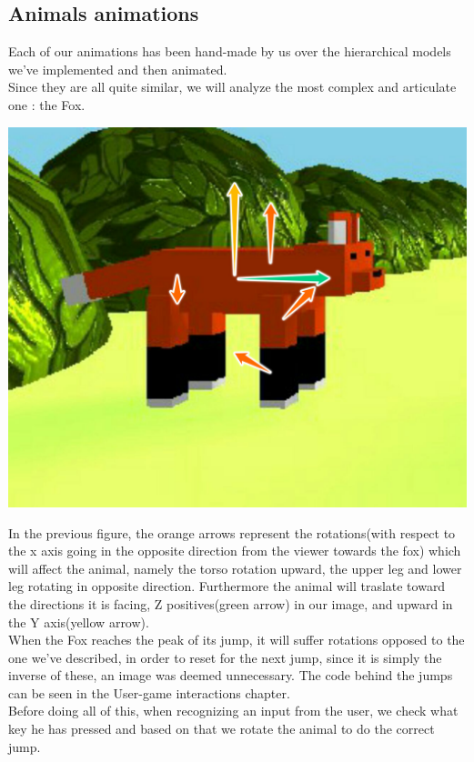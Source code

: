 \documentclass[a4paper, 11pt]{article}
\begin{document}
\subsection{Animals animations}
Each of our animations has been hand-made by us over the hierarchical models we've implemented and then animated.\\
Since they are all quite similar, we will analyze the most complex and articulate one : the Fox.\\
\begin{center}
	\includegraphics[scale=0.2]{FoxAnimation.jpeg}\\
\end{center}
In the previous figure, the orange arrows represent the rotations(with respect to the x axis going in the opposite direction from the viewer towards the fox) which will affect the animal, namely the torso rotation upward, the upper leg and lower leg rotating in opposite direction. Furthermore the animal will traslate toward the directions it is facing, Z positives(green arrow) in our image, and upward in the Y axis(yellow arrow).\\ When the Fox reaches the peak of its jump, it will suffer rotations opposed to the one we've described, in order to reset for the next jump, since it is simply the inverse of these, an image was deemed unnecessary. The code behind the jumps can be seen in the User-game interactions chapter.\\
Before doing all of this, when recognizing an input from the user, we check what key he has pressed and based on that we rotate the animal to do the correct jump.\\
\end{document}
